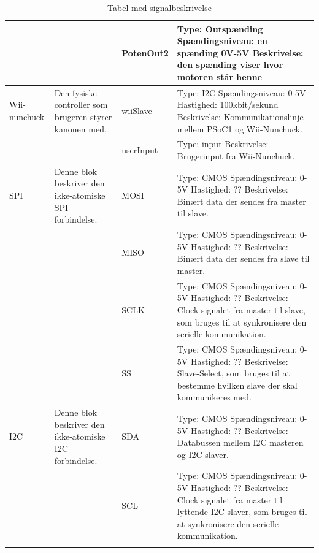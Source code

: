 \begin{longtable}{|>{\hspace{0pt}}p{3cm} | >{\hspace{0pt}}p{3cm} | p{2cm} | p{3cm} |}
	& & PotenOut2 & Type: Outspænding \newline Spændingsniveau: en spænding 0V-5V \newline Beskrivelse: den spænding viser hvor motoren står henne \\ \hline
	Wii-nunchuck & Den fysiske controller som brugeren styrer kanonen med. & wiiSlave & Type: I2C \newline Spændingsniveau: 0-5V \newline Hastighed: 100kbit/sekund \newline Beskrivelse: Kommunikationslinje mellem PSoC1 og Wii-Nunchuck. \\ \cline{3-4}
	& & userInput & Type: input \newline Beskrivelse: Brugerinput fra Wii-Nunchuck. \\ \hline
	SPI & Denne blok beskriver den ikke-atomiske SPI forbindelse. & MOSI & Type: CMOS \newline Spændingsniveau: 0-5V \newline Hastighed: ?? \newline Beskrivelse: Binært data der sendes fra master til slave. \\ \cline{3-4}
	& & MISO & Type: CMOS \newline Spændingsniveau: 0-5V \newline Hastighed: ?? \newline Beskrivelse: Binært data der sendes fra slave til master. \\ \cline{3-4}
	& & SCLK & Type: CMOS \newline Spændingsniveau: 0-5V \newline Hastighed: ?? \newline Beskrivelse: Clock signalet fra master til slave, som bruges til at synkronisere den serielle kommunikation. \\ \cline{3-4}
	& & SS & Type: CMOS \newline Spændingsniveau: 0-5V \newline Hastighed: ?? \newline  Beskrivelse: Slave-Select, som bruges til at bestemme hvilken slave der skal kommunikeres med. \\ \hline
	I2C & Denne blok beskriver den ikke-atomiske I2C forbindelse. & SDA & Type: CMOS \newline Spændingsniveau: 0-5V \newline Hastighed: ?? \newline Beskrivelse: Databussen mellem I2C masteren og I2C slaver. \\ \cline{3-4}
	& & SCL & Type: CMOS \newline Spændingsniveau: 0-5V \newline Hastighed: ?? \newline Beskrivelse: Clock signalet fra master til lyttende I2C slaver, som bruges til at synkronisere den serielle kommunikation. \\ \hline
	\caption{Tabel med signalbeskrivelse}
\end{longtable}

